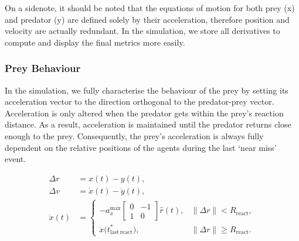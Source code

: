 \documentclass[10pt, twocolumn]{article}
\begin{document}
    On a sidenote, it should be noted that the equations of motion for both prey (x) and predator (y) are defined solely by their acceleration, therefore position and velocity are actually redundant. In the simulation, we store all derivatives to compute and display the final metrics more easily.

    \subsubsection{Prey Behaviour}
    In the simulation, we fully characterise the behaviour of the prey by setting its acceleration vector to the direction orthogonal to the predator-prey vector. Acceleration is only altered when the predator gets within the prey's reaction distance. As a result, acceleration is maintained until the predator returns close enough to the prey. Consequently, the prey's acceleration is always fully dependent on the relative positions of the agents during the last `near miss' event.

    \[
      \begin{aligned}
        \Delta r &= x(t) - y(t), \\
        \Delta v &= \dot{x}(t) - \dot{y}(t), \\
        \ddot{x}(t) &=
        \begin{cases}
          - a_x^{\max}
          \begin{bmatrix}
            0 & -1 \\
            1 & 0
          \end{bmatrix}
          \hat{r}(t), & \|\Delta r\| < R_{\mathrm{react}}, \\[1.2em]
          \ddot{x}\bigl(t^*_{\mathrm{last\,react}}\bigr), & \|\Delta r\| \ge R_{\mathrm{react}}.
        \end{cases}
      \end{aligned}
    \]
\end{document}
